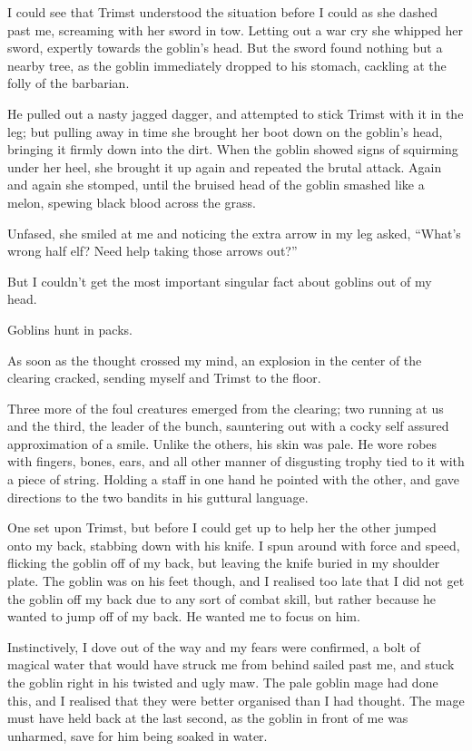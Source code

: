 \documentclass[12pt, a4paper]{book}
\begin{document}
I could see that Trimst understood the situation before I could as she dashed past me, screaming with her sword in tow. Letting out a war cry she whipped her sword, expertly towards the goblin's head. But the sword found nothing but a nearby tree, as the goblin immediately dropped to his stomach, cackling at the folly of the barbarian.

He pulled out a nasty jagged dagger, and attempted to stick Trimst with it in the leg; but pulling away in time she brought her boot down on the goblin's head, bringing it firmly down into the dirt. When the goblin showed signs of squirming under her heel, she brought it up again and repeated the brutal attack. Again and again she stomped, until the bruised head of the goblin smashed like a melon, spewing black blood across the grass.

Unfased, she smiled at me and noticing the extra arrow in my leg asked, ``What's wrong half elf? Need help taking those arrows out?''

But I couldn't get the most important singular fact about goblins out of my head.

Goblins hunt in packs.

As soon as the thought crossed my mind, an explosion in the center of the clearing cracked, sending myself and Trimst to the floor.

Three more of the foul creatures emerged from the clearing; two running at us and the third, the leader of the bunch, sauntering out with a cocky self assured approximation of a smile. Unlike the others, his skin was pale. He wore robes with fingers, bones, ears, and all other manner of disgusting trophy tied to it with a piece of string. Holding a staff in one hand he pointed with the other, and gave directions to the two bandits in his guttural language. 

One set upon Trimst, but before I could get up to help her the other jumped onto my back, stabbing down with his knife. I spun around with force and speed, flicking the goblin off of my back, but leaving the knife buried in my shoulder plate. The goblin was on his feet though, and I realised too late that I did not get the goblin off my back due to any sort of combat skill, but rather because he wanted to jump off of my back. He wanted me to focus on him. 

Instinctively, I dove out of the way and my fears were confirmed, a bolt of magical water that would have struck me from behind sailed past me, and stuck the goblin right in his twisted and ugly maw. The pale goblin mage had done this, and I realised that they were better organised than I had thought. The mage must have held back at the last second, as the goblin in front of me was unharmed, save for him being soaked in water.
\end{document}
